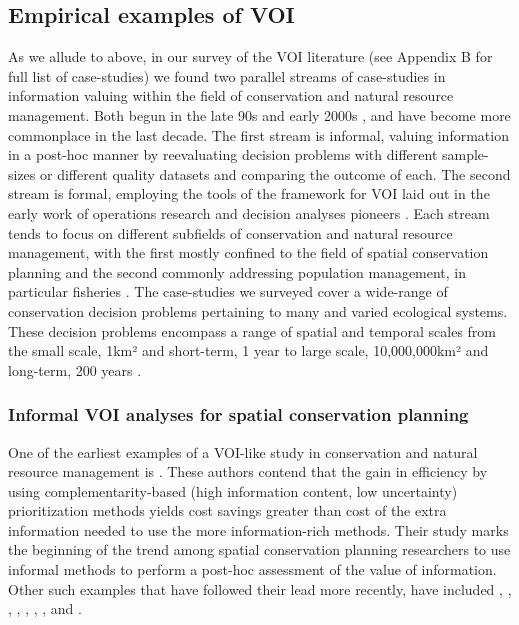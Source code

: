 \documentclass[]{article}
\theoremstyle{definition}
\theoremstyle{definition}
\theoremstyle{definition}
\theoremstyle{remark}
\begin{document}
\subsection*{Empirical examples of VOI}\label{empirical-examples-of-voi}

As we allude to above, in our survey of the VOI literature (see Appendix
B for full list of case-studies) we found two parallel streams of
case-studies in information valuing within the field of conservation and
natural resource management. Both begun in the late 90s and early 2000s
\citep[e.g.,][]{Balmford1999, Kuikka1999}, and have become more
commonplace in the last decade. The first stream is informal, valuing
information in a post-hoc manner by reevaluating decision problems with
different sample-sizes or different quality datasets and comparing the
outcome of each. The second stream is formal, employing the tools of the
framework for VOI laid out in the early work of operations research and
decision analyses pioneers \citep[e.g.,][]{Raiffa1961}. Each stream
tends to focus on different subfields of conservation and natural
resource management, with the first mostly confined to the field of
spatial conservation planning
\citep[e.g.,][]{Balmford1999, Grantham2008, Stoms2011, Runting2013} and
the second commonly addressing population management, in particular
fisheries \citep[e.g.,][]{Kuikka1999, Mantyniemi2009, Costello2010}. The
case-studies we surveyed cover a wide-range of conservation decision
problems pertaining to many and varied ecological systems. These
decision problems encompass a range of spatial and temporal scales from
the small scale, 1km² \citep[e.g.,][]{Perhans2014} and short-term, 1
year \citep[e.g.][]{Kuikka1999} to large scale, 10,000,000km²
\citep[e.g.,][]{Balmford1999} and long-term, 200 years
\citep[e.g.,][]{Moore2012}.

\subsubsection*{Informal VOI analyses for spatial conservation
planning}\label{informal-voi-analyses-for-spatial-conservation-planning}

One of the earliest examples of a VOI-like study in conservation and
natural resource management is \citet{Balmford1999}. These authors
contend that the gain in efficiency by using complementarity-based (high
information content, low uncertainty) prioritization methods yields cost
savings greater than cost of the extra information needed to use the
more information-rich methods. Their study marks the beginning of the
trend among spatial conservation planning researchers to use informal
methods to perform a post-hoc assessment of the value of information.
Other such examples that have followed their lead more recently, have
included \citet{Grantham2008}, \citet{Grantham2009}, \citet{Stoms2011},
\citet{Hermoso2013}, \citet{Runting2013}, \citet{Hermoso2015},
\citet{Lehtomaki2015}, \citet{Mazor2016} and \citet{Tulloch2016}.
\end{document}
